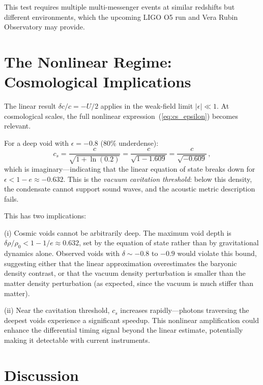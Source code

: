 \documentclass[12pt, a4paper]{article}
\begin{document}
This test requires multiple multi-messenger events
at similar redshifts but different environments,
which the upcoming LIGO O5 run and Vera Rubin
Observatory may provide.


\section{The Nonlinear Regime: Cosmological Implications}
\label{sec:nonlinear}

The linear result $\delta c/c = -U/2$ applies in the
weak-field limit $|\epsilon| \ll 1$. At cosmological
scales, the full nonlinear expression~(\ref{eq:cs_epsilon})
becomes relevant.

For a deep void with $\epsilon = -0.8$ (80\%
underdense):
\begin{equation}
    c_s = \frac{c}{\sqrt{1 + \ln(0.2)}}
    = \frac{c}{\sqrt{1 - 1.609}}
    = \frac{c}{\sqrt{-0.609}}\,,
\end{equation}
which is imaginary---indicating that the linear
equation of state breaks down for $\epsilon < 1 - e
\approx -0.632$. This is the \emph{vacuum cavitation
threshold}: below this density, the condensate cannot
support sound waves, and the acoustic metric
description fails.

This has two implications:

(i) Cosmic voids cannot be arbitrarily deep. The
maximum void depth is $\delta\rho/\rho_0 < 1 - 1/e
\approx 0.632$, set by the equation of state rather
than by gravitational dynamics alone. Observed voids
with $\delta \sim -0.8$ to $-0.9$ would violate this
bound, suggesting either that the linear
approximation overestimates the baryonic density
contrast, or that the vacuum density perturbation is
smaller than the matter density perturbation (as
expected, since the vacuum is much stiffer than
matter).

(ii) Near the cavitation threshold, $c_s$ increases
rapidly---photons traversing the deepest voids
experience a significant speedup. This nonlinear
amplification could enhance the differential timing
signal beyond the linear estimate, potentially making
it detectable with current instruments.


\section{Discussion}
\label{sec:discussion}
\end{document}

